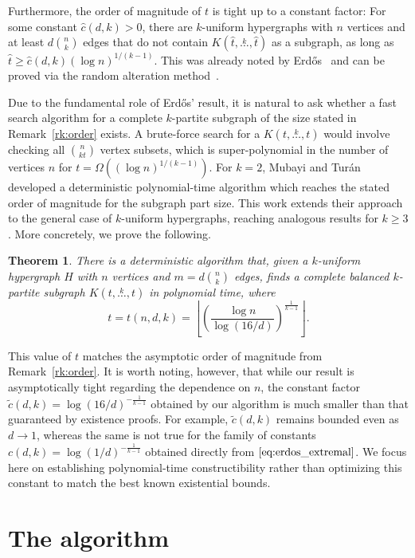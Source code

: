\documentclass{amsart}
\newcommand{\compoverset}[2]{\ensuremath{K(#2, \overset{#1}{\dots}, #2)}}
\newcommand{\bigOmega}[1]{\ensuremath{\Omega\left(#1\right)}}
\newtheorem{theorem}[subsection]{Theorem}
\begin{document}
    Furthermore, the order of magnitude of $t$ is tight up to a constant factor:
    For some constant $\hat{c}(d, k) > 0$,
    there are $k$-uniform hypergraphs with $n$ vertices and at least $d \binom{n}{k}$ edges
    that do not contain $\compoverset{k}{\hat{t}}$ as a subgraph, as long as
    $\hat{t} \geq \hat{c}(d, k)(\log n)^{1/(k-1)}$.
    This was already noted by Erd\H{o}s~\cite{Erdos1964} and can be proved via the random alteration method~\cite{alon2016probabilistic}.


    Due to the fundamental role of Erd\H{o}s' result,
    it is natural to ask whether a fast search algorithm for a complete $k$-partite subgraph of the size stated in Remark~\ref{rk:order} exists.
    A brute-force search for a $\compoverset{k}{t}$ would involve checking all $\binom{n}{kt}$ vertex subsets,
    which is super-polynomial in the number of vertices $n$ for ${t = \bigOmega{(\log n)^{1/(k-1)}}}$.
    For $k=2$, Mubayi and Tur\'{a}n~\cite{MUBAYI2010174} developed a deterministic polynomial-time algorithm which reaches the stated order of magnitude for the subgraph part size.
    This work extends their approach to the general case of $k$-uniform hypergraphs, reaching analogous results for $k \ge 3$.
    More concretely, we prove the following.

    \begin{theorem} \label{thm:main_theorem}
    There is a deterministic algorithm that, given a $k$-uniform hypergraph $H$ with $n$ vertices and $m=d \binom{n}{k}$ edges, finds a complete balanced $k$-partite subgraph $\compoverset{k}{t}$ in polynomial time, where
    \[
        t = t(n, d, k) = \left\lfloor \left( \frac{\log n}{\log (16/d)}\right)^{\frac{1}{k-1}}\right\rfloor.
    \]
    \end{theorem}
    This value of $t$ matches the asymptotic order of magnitude from Remark~\ref{rk:order}.
    It is worth noting, however, that while our result is asymptotically tight regarding the dependence on $n$,
    the constant factor ${\tilde{c}(d, k) = \log (16/d)^{-\frac{1}{k-1}}}$ obtained by our algorithm is much smaller than that guaranteed by existence proofs.
    For example, $\tilde{c}(d, k)$ remains bounded even as $d \to 1$, whereas the same is not true for the family of constants $c(d, k) = \log(1/d)^{-\frac{1}{k-1}}$
    obtained directly from $\eqref{eq:erdos_extremal}$.
    We focus here on establishing polynomial-time constructibility rather than optimizing this constant to match the best known existential bounds.

    \section{The algorithm}\label{sec:algorithm}
\end{document}

